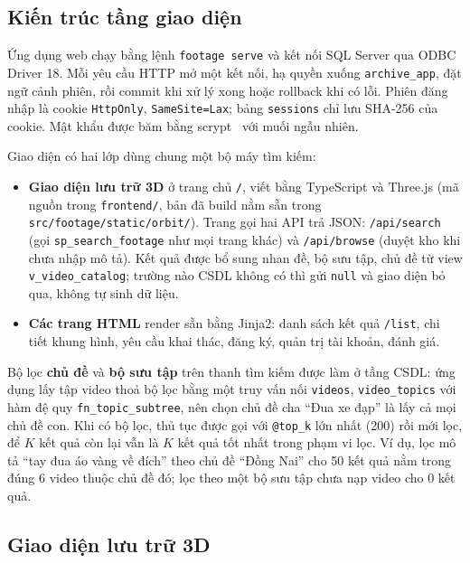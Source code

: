 \subsection{Kiến trúc tầng giao diện}

Ứng dụng web chạy bằng lệnh \texttt{footage serve} và kết nối SQL Server qua ODBC Driver 18.
Mỗi yêu cầu HTTP mở một kết nối, hạ quyền xuống \texttt{archive\_app}, đặt ngữ cảnh phiên, rồi
commit khi xử lý xong hoặc rollback khi có lỗi. Phiên đăng nhập là cookie
\texttt{HttpOnly}, \texttt{SameSite=Lax}; bảng \texttt{sessions} chỉ lưu SHA-256 của cookie.
Mật khẩu được băm bằng scrypt~\cite{rfc7914} với muối ngẫu nhiên.

Giao diện có hai lớp dùng chung một bộ máy tìm kiếm:
\begin{itemize}
    \item \textbf{Giao diện lưu trữ 3D} ở trang chủ \texttt{/}, viết bằng TypeScript và
    Three.js (mã nguồn trong \texttt{frontend/}, bản đã build nằm sẵn trong
    \texttt{src/footage/static/orbit/}). Trang gọi hai API trả JSON: \texttt{/api/search}
    (gọi \texttt{sp\_search\_footage} như mọi trang khác) và \texttt{/api/browse} (duyệt kho
    khi chưa nhập mô tả). Kết quả được bổ sung nhan đề, bộ sưu tập, chủ đề từ view
    \texttt{v\_video\_catalog}; trường nào CSDL không có thì gửi \texttt{null} và giao diện bỏ
    qua, không tự sinh dữ liệu.
    \item \textbf{Các trang HTML} render sẵn bằng Jinja2: danh sách kết quả \texttt{/list},
    chi tiết khung hình, yêu cầu khai thác, đăng ký, quản trị tài khoản, đánh giá.
\end{itemize}

Bộ lọc \textbf{chủ đề} và \textbf{bộ sưu tập} trên thanh tìm kiếm được làm ở tầng CSDL: ứng
dụng lấy tập video thoả bộ lọc bằng một truy vấn nối \texttt{videos}, \texttt{video\_topics}
với hàm đệ quy \texttt{fn\_topic\_subtree}, nên chọn chủ đề cha ``Đua xe đạp'' là lấy cả mọi
chủ đề con. Khi có bộ lọc, thủ tục được gọi với \texttt{@top\_k} lớn nhất (200) rồi mới lọc,
để $K$ kết quả còn lại vẫn là $K$ kết quả tốt nhất trong phạm vi lọc. Ví dụ, lọc mô tả ``tay
đua áo vàng về đích'' theo chủ đề ``Đồng Nai'' cho 50 kết quả nằm trong đúng 6 video thuộc
chủ đề đó; lọc theo một bộ sưu tập chưa nạp video cho 0 kết quả.

\subsection{Giao diện lưu trữ 3D}

